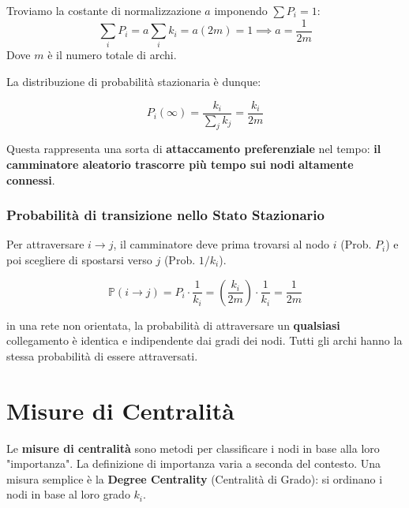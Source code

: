	\noindent Troviamo la costante di normalizzazione $a$ imponendo $\sum P_i = 1$:
	\begin{equation}
	    \sum_{i} P_i = a \sum_{i} k_i = a (2m) = 1 \implies a = \frac{1}{2m}
	\end{equation}
	Dove $m$ è il numero totale di archi.
	
	\noindent La distribuzione di probabilità stazionaria è dunque:
     \begin{tcolorbox}[colback=yellow!25, colframe=yellow!75!orange, coltitle=black, title=\textbf{Distribuzione di Probabilità Stazionaria}]
\begin{equation}
	    P_i (\infty)= \frac{k_i}{\sum_j k_j} = \frac{k_i}{2m}
	\end{equation}
\end{tcolorbox}
	Questa rappresenta una sorta di \textbf{attaccamento preferenziale} nel tempo: \textbf{il camminatore aleatorio trascorre più tempo sui nodi altamente connessi}.
	
	\subsubsection{Probabilità di transizione nello Stato Stazionario}
	Per attraversare $i \to j$, il camminatore deve prima trovarsi al nodo $i$ (Prob. $P_i$) e poi scegliere di spostarsi verso $j$ (Prob. $1/k_i$).
	
	\begin{equation}
	    \mathbb{P}(i \to j) = P_i \cdot \frac{1}{k_i} = \left( \frac{k_i}{2m} \right) \cdot \frac{1}{k_i} = \frac{1}{2m}
	\end{equation}

     \begin{tcolorbox}[colback=yellow!25, colframe=yellow!75!orange, coltitle=black, title=\textbf{Risultato Notevole:}]
in una rete non orientata, la probabilità di attraversare un \textbf{qualsiasi} collegamento è identica e indipendente dai gradi dei nodi. Tutti gli archi hanno la stessa probabilità di essere attraversati.
	
\end{tcolorbox}
	
	\section{Misure di Centralità}
	Le \textbf{misure di centralità} sono metodi per classificare i nodi in base alla loro "importanza". La definizione di importanza varia a seconda del contesto. Una misura semplice è la \textbf{Degree Centrality} (Centralità di Grado): si ordinano i nodi in base al loro grado $k_i$.

